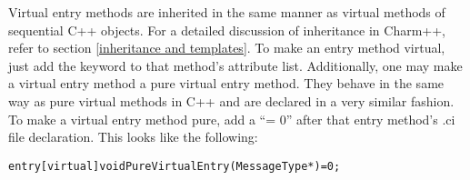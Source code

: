 Virtual entry methods are inherited in the
same manner as virtual methods of sequential C++ objects.  For a detailed
discussion of inheritance in Charm++, refer to section \ref{inheritance and
templates}.  To make an entry method virtual, just add the keyword
 to that method's attribute list.  Additionally, one may make
a virtual entry method a pure virtual entry method.  They
behave in the same way as pure virtual methods in C++ and are declared in a
very similar fashion.  To make a virtual entry method pure, add a ``= 0'' after
that entry method's .ci file declaration.  This looks like the following:

\begin{alltt}
entry [virtual] void PureVirtualEntry(MessageType *) = 0;
\end{alltt}



